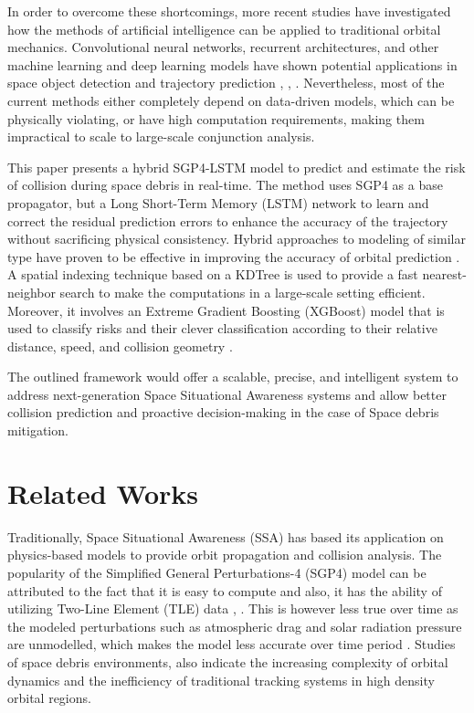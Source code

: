 \documentclass{ieeeaccess}
\begin{document}
In order to overcome these shortcomings, more recent studies have investigated how the methods of artificial intelligence can be applied to traditional orbital mechanics. Convolutional neural networks, recurrent architectures, and other machine learning and deep learning models have shown potential applications in space object detection and trajectory prediction \cite{b11}, \cite{b7}, \cite{b14}. Nevertheless, most of the current methods either completely depend on data-driven models, which can be physically violating, or have high computation requirements, making them impractical to scale to large-scale conjunction analysis.

This paper presents a hybrid SGP4-LSTM model to predict and estimate the risk of collision during space debris in real-time. The method uses SGP4 as a base propagator, but a Long Short-Term Memory (LSTM) network to learn and correct the residual prediction errors to enhance the accuracy of the trajectory without sacrificing physical consistency. Hybrid approaches to modeling of similar type have proven to be effective in improving the accuracy of orbital prediction \cite{b1}. A spatial indexing technique based on a KDTree is used to provide a fast nearest-neighbor search to make the computations in a large-scale setting efficient. Moreover, it involves an Extreme Gradient Boosting (XGBoost) model that is used to classify risks and their clever classification according to their relative distance, speed, and collision geometry \cite{b17}.

The outlined framework would offer a scalable, precise, and intelligent system to address next-generation Space Situational Awareness systems and allow better collision prediction and proactive decision-making in the case of Space debris mitigation.


\section{Related Works}
Traditionally, Space Situational Awareness (SSA) has based its application on physics-based models to provide orbit propagation and collision analysis. The popularity of the Simplified General Perturbations-4 (SGP4) model can be attributed to the fact that it is easy to compute and also, it has the ability of utilizing Two-Line Element (TLE) data \cite{b4}, \cite{b6}. This is however less true over time as the modeled perturbations such as atmospheric drag and solar radiation pressure are unmodelled, which makes the model less accurate over time period \cite{b5}. Studies of space debris environments, also indicate the increasing complexity of orbital dynamics and the inefficiency of traditional tracking systems in high density orbital regions.
\end{document}
